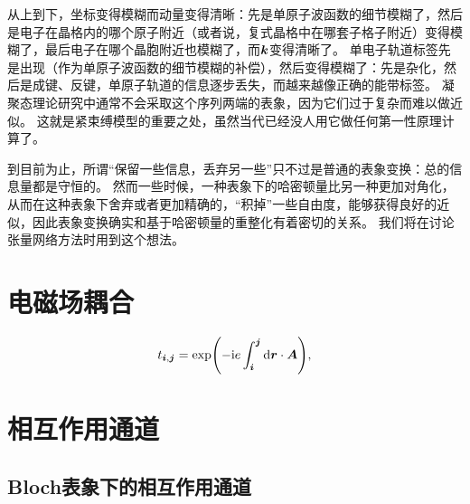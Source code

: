 从上到下，坐标变得模糊而动量变得清晰：先是单原子波函数的细节模糊了，然后是电子在晶格内的哪个原子附近（或者说，复式晶格中在哪套子格子附近）变得模糊了，最后电子在哪个晶胞附近也模糊了，而$\vb*{k}$变得清晰了。
单电子轨道标签先是出现（作为单原子波函数的细节模糊的补偿），然后变得模糊了：先是杂化，然后是成键、反键，单原子轨道的信息逐步丢失，而越来越像正确的能带标签。
凝聚态理论研究中通常不会采取这个序列两端的表象，因为它们过于复杂而难以做近似。
这就是紧束缚模型的重要之处，虽然当代已经没人用它做任何第一性原理计算了。

到目前为止，所谓“保留一些信息，丢弃另一些”只不过是普通的表象变换：总的信息量都是守恒的。
然而一些时候，一种表象下的哈密顿量比另一种更加对角化，从而在这种表象下舍弃或者更加精确的，“积掉”一些自由度，能够获得良好的近似，因此表象变换确实和基于哈密顿量的重整化有着密切的关系。
我们将在讨论张量网络方法时用到这个想法。

\section{电磁场耦合}


\begin{equation}
    t_{\vb*{i}, \vb*{j}} = \exp(- \mathrm{i} e \int_{\vb*{i}}^{\vb*{j}} \dd{\vb*{r}} \cdot \vb*{A}),
\end{equation}

\section{相互作用通道}

\subsection{Bloch表象下的相互作用通道}\label{sec:interaction-bloch}

